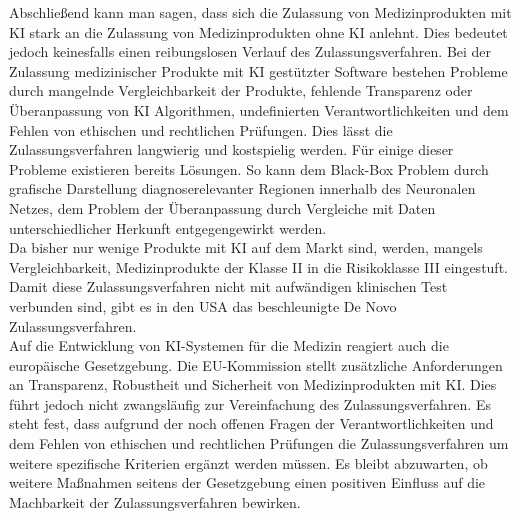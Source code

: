 Abschließend kann man sagen, dass sich die Zulassung von Medizinprodukten mit KI stark an die Zulassung von Medizinprodukten ohne KI anlehnt. Dies bedeutet jedoch keinesfalls einen reibungslosen Verlauf des Zulassungsverfahren. 
Bei der Zulassung medizinischer Produkte mit KI gestützter Software bestehen Probleme durch mangelnde Vergleichbarkeit der Produkte, fehlende Transparenz oder Überanpassung von KI Algorithmen, undefinierten Verantwortlichkeiten und dem Fehlen von ethischen und rechtlichen Prüfungen. Dies lässt die Zulassungsverfahren langwierig und kostspielig werden.
Für einige dieser Probleme existieren bereits Lösungen. So kann dem Black-Box Problem durch grafische Darstellung diagnoserelevanter Regionen innerhalb des Neuronalen Netzes, dem Problem der Überanpassung durch Vergleiche mit Daten unterschiedlicher Herkunft entgegengewirkt werden.\\ 
Da bisher nur wenige Produkte mit KI auf dem Markt sind, werden, mangels Vergleichbarkeit, Medizinprodukte der Klasse II in die Risikoklasse III eingestuft. Damit diese Zulassungsverfahren nicht mit aufwändigen klinischen Test verbunden sind, gibt es in den USA das beschleunigte De Novo Zulassungsverfahren.\\
Auf die Entwicklung von KI-Systemen für die Medizin reagiert auch die europäische Gesetzgebung. Die EU-Kommission stellt zusätzliche Anforderungen an Transparenz, Robustheit und Sicherheit von Medizinprodukten mit KI. Dies führt jedoch nicht zwangsläufig zur Vereinfachung des Zulassungsverfahren. 
Es steht fest, dass aufgrund der noch offenen Fragen der  Verantwortlichkeiten und dem Fehlen von ethischen und rechtlichen Prüfungen die Zulassungsverfahren um weitere spezifische Kriterien ergänzt werden müssen. 
Es bleibt abzuwarten, ob weitere Maßnahmen seitens der Gesetzgebung einen positiven Einfluss auf die Machbarkeit der Zulassungsverfahren bewirken.


